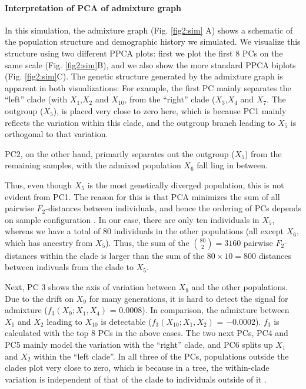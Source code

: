 \documentclass[12pt, letterpaper]{article}
\begin{document}
\paragraph{Interpretation of PCA of admixture graph}
In this simulation, the admixture graph (Fig. \ref{fig2:sim} A) shows a schematic of the population structure and demographic history we simulated.  We visualize this structure using two different PPCA plots: first we plot the first 8 PCs on the same scale (Fig. \ref{fig2:sim}B), and we also show the more standard PPCA biplots (Fig. \ref{fig2:sim}C). The genetic structure generated by the admixture graph is apparent in both visualizations: For example, the first PC mainly separates  the ``left'' clade (with $X_1$,$X_2$ and $X_10$, from the ``right'' clade ($X_3$,$X_4$ and $X_7$. The outgroup ($X_5$), is placed very close to zero here, which is because PC1 mainly reflects the variation within this clade, and the outgroup branch leading to $X_5$ is orthogonal to that variation. 

PC2, on the other hand, primarily separates out the outgroup ($X_5$) from the remaining samples, with the admixed population $X_6$ fall ling in between.

Thus, even though $X_5$ is the most genetically diverged population, this is not evident from PC1. The reason for this is that PCA minimizes the sum of all pairwise $F_2$-distances between individuals, and hence the ordering of PCs depends on sample configuration \cite{mcvean_genealogical_2009, elhaik_principal_2022}. In our case, there are only ten individuals in $X_5$, whereas we have a total of 80 individuals in the other populations (all except $X_6$, which has ancestry from $X_5$). Thus, the sum of the $\binom{80}{2}=3160$ pairwise $F_2$-distances within the clade is larger than the sum of the $80 \times 10 = 800$ distances between indivuals from the clade to $X_5$. 

Next, PC 3 shows the axis of variation between $X_9$ and the other populations. Due to the drift on $X_9$ for many generations, it is hard to detect the signal for admixture ($f_3(X_9; X_1, X_4)$ = $0.0008$). In comparison, the admixture between $X_1$ and $X_2$ leading to $X_{10}$ is detectable ($f_3(X_10; X_1, X_2)$ = $-0.0002$). $f_3$ is calculated with the top 8 PCs in the above cases. The two next PCs, PC4 and PC5 mainly model the variation with the ``right'' clade, and PC6 splits up $X_1$ and $X_2$ within the ``left clade''. In all three of the PCs, populations outside the clades plot very close to zero, which is because in a tree, the within-clade variation is independent of that of the clade to individuals outside of it \citep{felsenstein_maximum-likelihood_1973}. 
\end{document}
